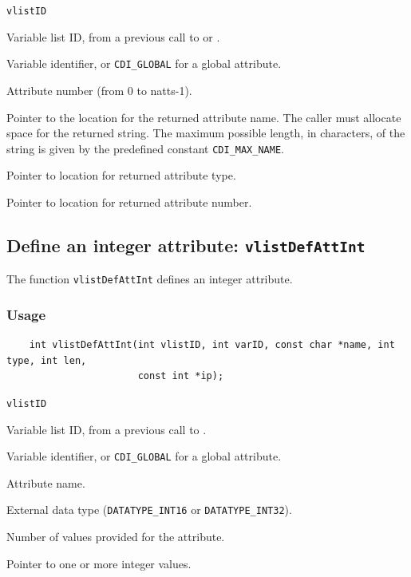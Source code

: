 \hspace*{4mm}\begin{minipage}[]{15cm}
\begin{deflist}{\tt vlistID\ }
\item[{\tt vlistID}]
Variable list ID, from a previous call to {} or {}.
\item[{\tt varID}]
Variable identifier, or {\tt CDI\_GLOBAL} for a global attribute.
\item[{\tt attnum}]
Attribute number (from 0 to natts-1).
\item[{\tt name}]
Pointer to the location for the returned attribute name. The caller must allocate space for the 
                    returned string. The maximum possible length, in characters, of
                    the string is given by the predefined constant {\tt CDI\_MAX\_NAME}.
\item[{\tt typep}]
Pointer to location for returned attribute type.
\item[{\tt lenp}]
Pointer to location for returned attribute number.

\end{deflist}
\end{minipage}


\subsection{Define an integer attribute: {\tt vlistDefAttInt}}
\label{vlistDefAttInt}

The function {\tt vlistDefAttInt} defines an integer attribute.

\subsubsection*{Usage}

\begin{verbatim}
    int vlistDefAttInt(int vlistID, int varID, const char *name, int type, int len, 
                       const int *ip);
\end{verbatim}

\hspace*{4mm}\begin{minipage}[]{15cm}
\begin{deflist}{\tt vlistID\ }
\item[{\tt vlistID}]
Variable list ID, from a previous call to {}.
\item[{\tt varID}]
Variable identifier, or {\tt CDI\_GLOBAL} for a global attribute.
\item[{\tt name}]
Attribute name.
\item[{\tt type}]
External data type ({\tt DATATYPE\_INT16} or {\tt DATATYPE\_INT32}).
\item[{\tt len}]
Number of values provided for the attribute.
\item[{\tt ip}]
Pointer to one or more integer values.

\end{deflist}
\end{minipage}


